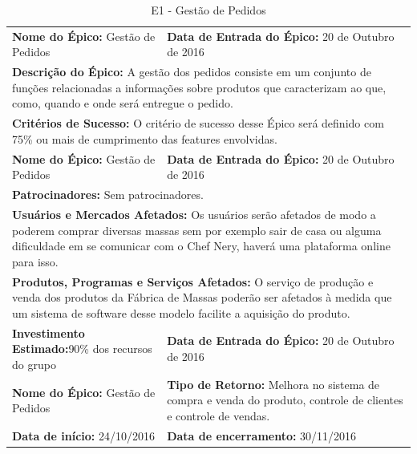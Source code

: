 \begin{table}[]
\centering
\caption{E1 - Gestão de Pedidos}
\label{my-label}
\begin{tabular}{|p{7cm}|p{8cm}|}
\cline{1-2}
\textbf{Nome do Épico:} Gestão de Pedidos &  \textbf{Data de Entrada do Épico:} 20 de Outubro de 2016\\ \cline{1-2}
\multicolumn{2}{|p{15cm}|}{ \textbf{Descrição do Épico:} A gestão dos pedidos consiste em um conjunto de funções relacionadas  a informações sobre produtos que caracterizam ao que, como, quando e onde será entregue o pedido.} \\ \cline{1-2}
\multicolumn{2}{|p{15cm}|}{\textbf{Critérios de Sucesso:} O critério de sucesso desse Épico será definido com 75\% ou mais de cumprimento das features envolvidas.} \\ \cline{1-2}
\textbf{Nome do Épico:} Gestão de Pedidos &  \textbf{Data de Entrada do Épico:} 20 de Outubro de 2016\\ \cline{1-2}
\multicolumn{2}{|p{15cm}|}{ \textbf{Patrocinadores:} Sem patrocinadores.} \\ \cline{1-2}
\multicolumn{2}{|p{15cm}|}{ \textbf{Usuários e Mercados Afetados:} Os usuários serão afetados de modo a poderem comprar diversas massas sem por exemplo sair de casa ou alguma dificuldade em se comunicar com o Chef Nery, haverá uma plataforma online para isso.} \\ \cline{1-2}
\multicolumn{2}{|p{15cm}|}{ \textbf{Produtos, Programas e Serviços Afetados:} O serviço de produção e venda dos produtos da Fábrica de Massas poderão ser afetados à medida que um sistema de software desse modelo facilite a aquisição do produto. } \\ \cline{1-2}
\textbf{Investimento Estimado:}90\% dos recursos do grupo &  \textbf{Data de Entrada do Épico:} 20 de Outubro de 2016\\ \cline{1-2}
\textbf{Nome do Épico:} Gestão de Pedidos & \textbf{Tipo de Retorno:} Melhora no sistema de compra e venda do produto, controle de clientes e controle de vendas.\\ \cline{1-2}
\textbf{Data de início:} 24/10/2016 & \textbf{Data de encerramento:} 30/11/2016\\ \cline{1-2}
\end{tabular}
\end{table}

\tab \\ \\ \\

